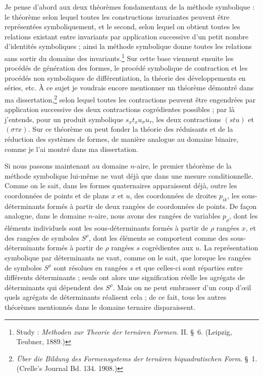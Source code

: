 \documentclass[11pt]{article}
\begin{document}
Je pense d'abord aux deux théorèmes fondamentaux de la méthode symbolique : le théorème selon lequel toutes les constructions invariantes peuvent être représentées symboliquement, et le second, selon lequel on obtient toutes les relations existant entre invariants par application successive d'un petit nombre d'identités symboliques ; ainsi la méthode symbolique donne toutes les relations sans sortir du domaine des invariants.\footnote{Study : \emph{Methoden zur Theorie der ternären Formen}. II. \S\ 6. (Leipzig, Teubner, 1889.)} Sur cette base viennent ensuite les procédés de génération des formes, le procédé symbolique de contraction et les procédés non symboliques de différentiation, la théorie des développements en séries, etc. À ce sujet je voudrais encore mentionner un théorème démontré dans ma dissertation,\footnote{\emph{Über die Bildung des Formensystems der ternären biquadratischen Form}. \S\ 1. (Crelle's Journal Bd. 134. 1908.)} selon lequel toutes les contractions peuvent être engendrées par application successive des deux contractions \og{} cogrédientes \fg{} possibles ; par là j'entends, pour un produit symbolique $s_x t_x u_\sigma u_\tau$, les deux contractions $(stu)$ et $(\sigma\tau x)$. Sur ce théorème on peut fonder la théorie des réduisants et de la réduction des systèmes de formes, de manière analogue au domaine binaire, comme je l'ai montré dans ma dissertation.

Si nous passons maintenant au domaine $n$-aire, le premier théorème de la méthode symbolique lui-même ne vaut déjà que dans une mesure conditionnelle. Comme on le sait, dans les formes quaternaires apparaissent déjà, outre les coordonnées de points et de plans $x$ et $u$, des coordonnées de droites $p_{ik}$, les sous-déterminants formés à partir de deux rangées de coordonnées de points. De façon analogue, dans le domaine $n$-aire, nous avons des rangées de variables $p_\rho$, dont les éléments individuels sont les sous-déterminants formés à partir de $\rho$ rangées $x$, et des rangées de symboles $S^\rho$, dont les éléments se comportent comme des sous-déterminants formés à partir de $\rho$ rangées $s$ cogrédientes aux $u$. La représentation symbolique par déterminants ne vaut, comme on le sait, que lorsque les rangées de symboles $S^\rho$ sont résolues en rangées $s$ et que celles-ci sont réparties entre différents déterminants ; seuls ont alors une signification réelle les agrégats de déterminants qui dépendent des $S^\rho$. Mais on ne peut embrasser d'un coup d'\oe{}il quels agrégats de déterminants réalisent cela ; de ce fait, tous les autres théorèmes mentionnés dans le domaine ternaire disparaissent.
\end{document}
